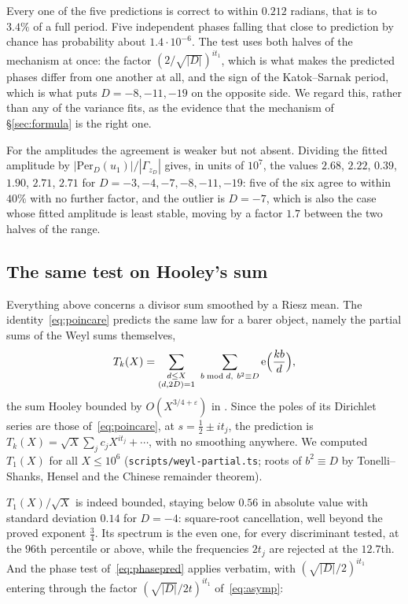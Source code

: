 \documentclass[11pt,a4paper]{article}
\theoremstyle{remark}\newtheorem{remark}[theorem]{Remark}
\newcommand{\e}{\mathrm e}\newcommand{\Off}{\mathrm{Off}}\newcommand{\rep}[2]{\langle #1\rangle_{#2}}
\begin{document}
Every one of the five predictions is correct to within $0.212$ radians, that is to $3.4\%$ of a full period. Five
independent phases falling that close to prediction by chance has probability about $1.4\cdot10^{-6}$. The test uses
both halves of the mechanism at once: the factor $(2/\sqrt{|D|})^{it_1}$, which is what makes the predicted phases
differ from one another at all, and the sign of the Katok--Sarnak period, which is what puts $D=-8,-11,-19$ on the
opposite side. We regard this, rather than any of the variance fits, as the evidence that the mechanism of
\S\ref{sec:formula} is the right one.

For the amplitudes the agreement is weaker but not absent. Dividing the fitted amplitude by
$|\mathrm{Per}_D(u_1)|/|\Gamma_{z_D}|$ gives, in units of $10^7$, the values $2.68$, $2.22$, $0.39$, $1.90$, $2.71$,
$2.71$ for $D=-3,-4,-7,-8,-11,-19$: five of the six agree to within $40\%$ with no further factor, and the outlier is
$D=-7$, which is also the case whose fitted amplitude is least stable, moving by a factor $1.7$ between the two halves
of the range.

\subsection{The same test on Hooley's sum}\label{sec:hooley}

Everything above concerns a divisor sum smoothed by a Riesz mean. The identity~\eqref{eq:poincare} predicts the same
law for a barer object, namely the partial sums of the Weyl sums themselves,
\[
T_k(X)=\sum_{\substack{d\le X\\ (d,2D)=1}}\ \sum_{b\bmod d,\ b^2\equiv D}\e\Bigl(\frac{kb}d\Bigr),
\]
the sum Hooley bounded by $O(X^{3/4+\varepsilon})$ in \cite{Hooley1963}. Since the poles of its Dirichlet series are
those of~\eqref{eq:poincare}, at $s=\tfrac12\pm it_j$, the prediction is $T_k(X)=\sqrt X\sum_jc_jX^{it_j}+\cdots$, with
no smoothing anywhere. We computed $T_1(X)$ for all $X\le10^6$ (\texttt{scripts/weyl-partial.ts}; roots of
$b^2\equiv D$ by Tonelli--Shanks, Hensel and the Chinese remainder theorem).

$T_1(X)/\sqrt X$ is indeed bounded, staying below $0.56$ in absolute value with standard deviation $0.14$ for
$D=-4$: square-root cancellation, well beyond the proved exponent $\tfrac34$. Its spectrum is the even one, for every
discriminant tested, at the $96$th percentile or above, while the frequencies $2t_j$ are rejected at the $12.7$th.
And the phase test of~\eqref{eq:phasepred} applies verbatim, with $(\sqrt{|D|}/2)^{it_1}$ entering through the
factor $(\sqrt{|D|}/2t)^{it_1}$ of~\eqref{eq:asymp}:
\end{document}
